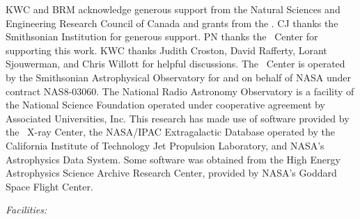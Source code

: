 \documentclass{emulateapj}
\begin{document}
\acknowledgements

KWC and BRM acknowledge generous support from the Natural Sciences and
Engineering Research Council of Canada and grants from the \cxo. CJ
thanks the Smithsonian Institution for generous support. PN thanks the
\cxo\ Center for supporting this work. KWC thanks Judith Croston,
David Rafferty, Lorant Sjouwerman, and Chris Willott for helpful
discussions. The \cxo\ Center is operated by the Smithsonian
Astrophysical Observatory for and on behalf of NASA under contract
NAS8-03060. The National Radio Astronomy Observatory is a facility of
the National Science Foundation operated under cooperative agreement
by Associated Universities, Inc. This research has made use of
software provided by the \chandra\ X-ray Center, the NASA/IPAC
Extragalactic Database operated by the California Institute of
Technology Jet Propulsion Laboratory, and NASA's Astrophysics Data
System. Some software was obtained from the High Energy Astrophysics
Science Archive Research Center, provided by NASA's Goddard Space
Flight Center.


{\it Facilities:}  





\clearpage



\end{document}
